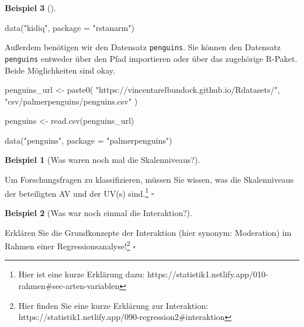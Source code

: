 \documentclass[
  ngerman,
  letterpaper,
  twoside,
  open=any]{scrbook}
\newenvironment{Shaded}{\begin{snugshade}}{\end{snugshade}}
\newcommand{\AttributeTok}[1]{\textcolor[rgb]{0.40,0.45,0.13}{#1}}
\newcommand{\FunctionTok}[1]{\textcolor[rgb]{0.28,0.35,0.67}{#1}}
\newcommand{\NormalTok}[1]{\textcolor[rgb]{0.00,0.23,0.31}{#1}}
\newcommand{\OtherTok}[1]{\textcolor[rgb]{0.00,0.23,0.31}{#1}}
\newcommand{\StringTok}[1]{\textcolor[rgb]{0.13,0.47,0.30}{#1}}
\theoremstyle{definition}
\newtheorem{example}{Beispiel}[chapter]
\theoremstyle{plain}
\theoremstyle{definition}
\theoremstyle{definition}
\theoremstyle{remark}
\begin{document}
\begin{example}[]
\begin{Shaded}
\begin{Highlighting}[]
\FunctionTok{data}\NormalTok{(}\StringTok{"kidiq"}\NormalTok{, }\AttributeTok{package =} \StringTok{"rstanarm"}\NormalTok{)}
\end{Highlighting}
\end{Shaded}

Außerdem benötigen wir den Datensatz \texttt{penguins}. Sie können den
Datensatz \texttt{penguins} entweder über den Pfad importieren oder über
das zugehörige R-Paket. Beide Möglichkeiten sind okay.

\begin{Shaded}
\begin{Highlighting}[]
\NormalTok{penguins\_url }\OtherTok{\textless{}{-}} \FunctionTok{paste0}\NormalTok{(}
  \StringTok{"https://vincentarelbundock.github.io/Rdatasets/"}\NormalTok{,}
  \StringTok{"csv/palmerpenguins/penguins.csv"}
\NormalTok{)}

\NormalTok{penguins }\OtherTok{\textless{}{-}} \FunctionTok{read.csv}\NormalTok{(penguins\_url)}
\end{Highlighting}
\end{Shaded}

\begin{Shaded}
\begin{Highlighting}[]
\FunctionTok{data}\NormalTok{(}\StringTok{"penguins"}\NormalTok{, }\AttributeTok{package =} \StringTok{"palmerpenguins"}\NormalTok{)}
\end{Highlighting}
\end{Shaded}

\begin{example}[Was waren noch mal die
Skalenniveaus?]\protect\hypertarget{exm-skalenniveaus}{}\label{exm-skalenniveaus}

Um Forschungsfragen zu klassifizieren, müssen Sie wissen, was die
Skalenniveaus der beteiligten AV und der UV(s) sind.\footnote{Hier ist
  eine kurze Erklärung dazu:
  https://statistik1.netlify.app/010-rahmen\#sec-arten-variablen}
\(\square\)

\end{example}

\begin{example}[Was war noch einmal die
Interaktion?]\protect\hypertarget{exm-interaktion}{}\label{exm-interaktion}

Erklären Sie die Grundkonzepte der Interaktion (hier synonym:
Moderation) im Rahmen einer Regressionsanalyse!\footnote{Hier finden Sie
  eine kurze Erklärung zur Interaktion:
  https://statistik1.netlify.app/090-regression2\#interaktion}
\(\square\)


\end{example}
\end{example}
\end{document}
